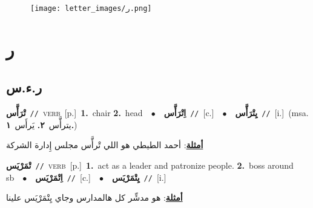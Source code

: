 \documentclass[10pt,a4paper,twoside]{article} %
\begin{document}
\begin{figure*}[t!]\centering\texttt{[image: letter\_images/ر.png]}\end{figure*}
\color{white}

 \section*{\foreignlanguage{arabic}{ر}} 
 \begin{multicols}{2} 

%
\color{black}
\vspace{-3mm}
\subsection*{\color{blue}\foreignlanguage{arabic}{ر.ء.س}\color{blue}{}} 

{\setlength\topsep{0pt}\textbf{\foreignlanguage{arabic}{تْرَأَّس}}\ {\color{gray}\texttt{//}\color{black}}\ \textsc{verb}\ [p.]\ \textbf{1.}~chair  \textbf{2.}~head\ \ $\bullet$\ \ \setlength\topsep{0pt}\textbf{\foreignlanguage{arabic}{اِتْرَأَّس}}\ {\color{gray}\texttt{//}\color{black}}\ [c.]\ \ $\bullet$\ \ \setlength\topsep{0pt}\textbf{\foreignlanguage{arabic}{يِتْرَأَّس}}\ {\color{gray}\texttt{//}\color{black}}\ [i.]\ \color{gray}(msa. \foreignlanguage{arabic}{يترأَّس}~\foreignlanguage{arabic}{\textbf{٢.}}  \foreignlanguage{arabic}{يَرأَس}~\foreignlanguage{arabic}{\textbf{١.}})\color{black}\  \begin{flushright}\color{gray}\foreignlanguage{arabic}{\textbf{\underline{\foreignlanguage{arabic}{أمثلة}}}: أحمد الطيطي هو اللي تْرأَّس مجلس إِدارة الشركة}\end{flushright}\color{black}} \vspace{2mm}

{\setlength\topsep{0pt}\textbf{\foreignlanguage{arabic}{تْمَرْيَس}}\ {\color{gray}\texttt{//}\color{black}}\ \textsc{verb}\ [p.]\ \textbf{1.}~act as a leader and patronize people.  \textbf{2.}~boss around sb\ \ $\bullet$\ \ \setlength\topsep{0pt}\textbf{\foreignlanguage{arabic}{اِتْمَرْيَس}}\ {\color{gray}\texttt{//}\color{black}}\ [c.]\ \ $\bullet$\ \ \setlength\topsep{0pt}\textbf{\foreignlanguage{arabic}{يِتْمَرْيَس}}\ {\color{gray}\texttt{//}\color{black}}\ [i.]\  \begin{flushright}\color{gray}\foreignlanguage{arabic}{\textbf{\underline{\foreignlanguage{arabic}{أمثلة}}}: هو مدشِّر كل هالمدارس وجاي يِتْمَرْيَس علينا}\end{flushright}\color{black}} \vspace{2mm}


\end{multicols}
\end{document}
